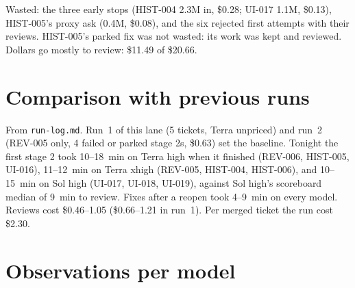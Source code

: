 \documentclass[11pt,a4paper]{article}
\begin{document}
\begin{center}
\end{center}

Wasted: the three early stops (HIST-004 2.3M in, \$0.28; UI-017 1.1M, \$0.13), HIST-005's proxy
ask (0.4M, \$0.08), and the six rejected first attempts with their reviews. HIST-005's parked
fix was not wasted: its work was kept and reviewed. Dollars go mostly to review: \$11.49 of
\$20.66.

\section*{Comparison with previous runs}

From \texttt{run-log.md}. Run~1 of this lane (5 tickets, Terra unpriced) and run~2 (REV-005 only,
4 failed or parked stage 2s, \$0.63) set the baseline. Tonight the first stage 2 took 10--18~min
on Terra high when it finished (REV-006, HIST-005, UI-016), 11--12~min on Terra xhigh (REV-005,
HIST-004, HIST-006), and 10--15~min on Sol high (UI-017, UI-018, UI-019), against Sol high's
scoreboard median of 9~min to review. Fixes after a reopen took 4--9~min on every model. Reviews
cost \$0.46--1.05 (\$0.66--1.21 in run~1). Per merged ticket the run cost \$2.30.

\section*{Observations per model}
\end{document}
